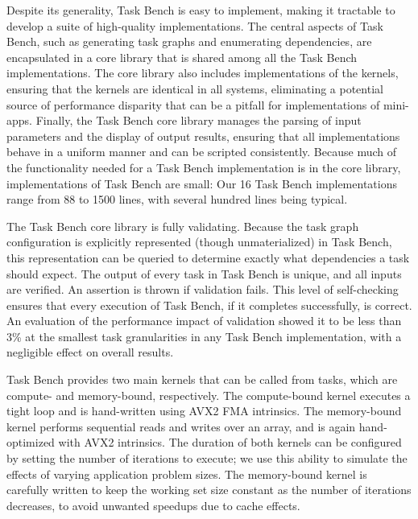 Despite its generality, Task Bench is easy to implement, making it
tractable to develop a suite of high-quality implementations. The central aspects of Task Bench, such as generating
task graphs and enumerating dependencies, are encapsulated in a core
library that is shared among all the Task Bench implementations. The
core library also includes implementations of the kernels, ensuring
that the kernels are identical in all systems, eliminating a potential
source of performance disparity that can be a pitfall for
implementations of mini-apps. Finally, the Task Bench core library manages the
parsing of input parameters and the display of output results,
ensuring that all implementations behave in a uniform manner and can
be scripted consistently. Because much of the functionality needed for
a Task Bench implementation is in the core library, implementations of
Task Bench are small: Our 16 Task Bench implementations range from 88
to 1500 lines, with several hundred lines being typical.




The Task Bench core library is fully
validating. Because the task graph configuration is explicitly
represented (though unmaterialized) in Task Bench, this representation
can be queried to determine exactly what dependencies a task should
expect. The output of every task in Task Bench is unique,
and all inputs are verified. An assertion is thrown if validation
fails. This level of self-checking ensures that every execution of Task Bench, if it
completes successfully, is correct. An evaluation of the performance impact of
validation showed it to be less than 3\% at the smallest task
granularities in any Task Bench implementation, with a negligible
effect on overall results.

Task Bench provides two main kernels that can be called from tasks,
which are compute- and memory-bound, respectively. The compute-bound
kernel executes a tight loop and is hand-written using AVX2 FMA
intrinsics. The memory-bound kernel performs sequential reads and
writes over an array, and is again hand-optimized with AVX2
intrinsics. The duration of both kernels can be configured by setting
the number of iterations to execute; we use this ability to simulate
the effects of varying application problem sizes. The memory-bound
kernel is carefully written to keep the working set size constant as
the number of iterations decreases, to avoid unwanted speedups due to
cache effects.
